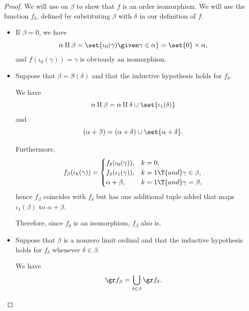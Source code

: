 \begin{proof}
  We will use  on \( \beta \) to show that \( f \) is an order isomorphism. We will use the function \( f_\delta \), defined by substituting \( \beta \) with \( \delta \) in our definition of \( f \).

  \begin{itemize}
    \item If \( \beta = 0 \), we have
    \begin{equation*}
       \alpha \amalg \beta = \set{ \iota_0(\gamma) \given \gamma \in \alpha } = \set{ 0 } \times \alpha,
    \end{equation*}
    and \( f(\iota_0(\gamma)) = \gamma \) is obviously an isomorphism.

    \item Suppose that \( \beta = S(\delta) \) and that the inductive hypothesis holds for \( f_\delta \).

    We have
    \begin{equation*}
      \alpha \amalg \beta = \alpha \amalg \delta \cup \set{ \iota_1(\delta) }
    \end{equation*}
    and
    \begin{equation*}
      (\alpha + \beta) = (\alpha + \delta) \cup \set{ \alpha + \delta }.
    \end{equation*}

    Furthermore,
    \begin{equation*}
      f_\beta(\iota_k(\gamma)) = \begin{cases}
        f_\delta(\iota_0(\gamma)), &k = 0, \\
        f_\delta(\iota_1(\gamma)), &k = 1 \T{and} \gamma \in \beta, \\
        \alpha + \beta,            &k = 1 \T{and} \gamma = \beta,
      \end{cases}
    \end{equation*}
    hence \( f_\beta \) coincides with \( f_\delta \) but has one additional tuple added that maps \( \iota_1(\beta) \) to \( \alpha + \beta \).

    Therefore, since \( f_\delta \) is an isomorphism, \( f_\beta \) also is.

    \item Suppose that \( \beta \) is a nonzero limit ordinal and that the inductive hypothesis holds for \( f_\delta \) whenever \( \delta \in \beta \).

    We have
    \begin{equation*}
      \gr f_\beta = \bigcup_{\delta \in \beta} \gr f_\delta.
    \end{equation*}


\end{itemize}
\end{proof}
